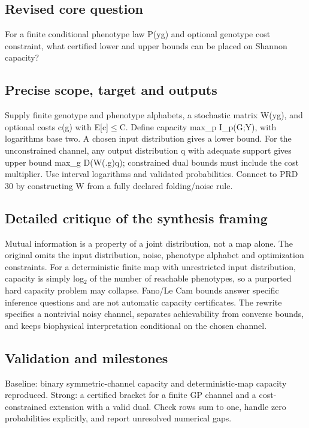 \documentclass[
  11pt,
]{article}
\begin{document}
\subsection{Revised core question}

For a finite conditional phenotype law P(y\textbar g) and optional
genotype cost constraint, what certified lower and upper bounds can be
placed on Shannon capacity?

\subsection{Precise scope, target and outputs}

Supply finite genotype and phenotype alphabets, a stochastic matrix
W(y\textbar g), and optional costs c(g) with E[c]\ensuremath{\le}C.
Define capacity max\_p I\_p(G;Y), with logarithms base two. A chosen
input distribution gives a lower bound. For the unconstrained channel,
any output distribution q with adequate support gives upper bound max\_g
D(W(.\textbar g)\textbar\textbar q); constrained dual bounds must
include the cost multiplier. Use interval logarithms and validated
probabilities. Connect to PRD 30 by constructing W from a fully declared
folding/noise rule.

\subsection{Detailed critique of the synthesis framing}

Mutual information is a property of a joint distribution, not a map
alone. The original omits the input distribution, noise, phenotype
alphabet and optimization constraints. For a deterministic finite map
with unrestricted input distribution, capacity is simply
log\ensuremath{{}_{2}} of the number of reachable phenotypes, so a
purported hard capacity problem may collapse. Fano/Le Cam bounds answer
specific inference questions and are not automatic capacity
certificates. The rewrite specifies a nontrivial noisy channel,
separates achievability from converse bounds, and keeps biophysical
interpretation conditional on the chosen channel.

\subsection{Validation and milestones}

Baseline: binary symmetric-channel capacity and deterministic-map
capacity reproduced. Strong: a certified bracket for a finite GP channel
and a cost-constrained extension with a valid dual. Check rows sum to
one, handle zero probabilities explicitly, and report unresolved
numerical gaps.
\end{document}
